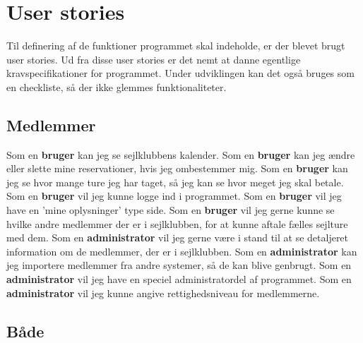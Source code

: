 \chapter{User stories}\label{User_stories}
Til definering af de funktioner programmet skal indeholde, er der blevet brugt user stories.
Ud fra disse user stories er det nemt at danne egentlige kravspecifikationer for programmet. 
Under udviklingen kan det også bruges som en checkliste, så der ikke glemmes funktionaliteter. 

\section{Medlemmer}
Som en \textbf{bruger} kan jeg se sejlklubbens kalender.
\newline
Som en \textbf{bruger} kan jeg ændre eller slette mine reservationer, hvis jeg ombestemmer mig.
\newline
Som en \textbf{bruger} kan jeg se hvor mange ture jeg har taget, så jeg kan se hvor meget jeg skal betale.
\newline
Som en \textbf{bruger} vil jeg kunne logge ind i programmet.
\newline
Som en \textbf{bruger} vil jeg have en 'mine oplysninger' type side. 
\newline
Som en \textbf{bruger} vil jeg gerne kunne se hvilke andre medlemmer der er i sejlklubben, for at kunne aftale fælles sejlture med dem.
\newline
Som en \textbf{administrator} vil jeg gerne være i stand til at se detaljeret information om de medlemmer, der er i sejlklubben.
\newline
Som en \textbf{administrator} kan jeg importere medlemmer fra andre systemer, så de kan blive genbrugt.
\newline
Som en \textbf{administrator} vil jeg have en speciel administratordel af programmet.
\newline
Som en \textbf{administrator} vil jeg kunne angive rettighedsniveau for medlemmerne.

\section{Både}

